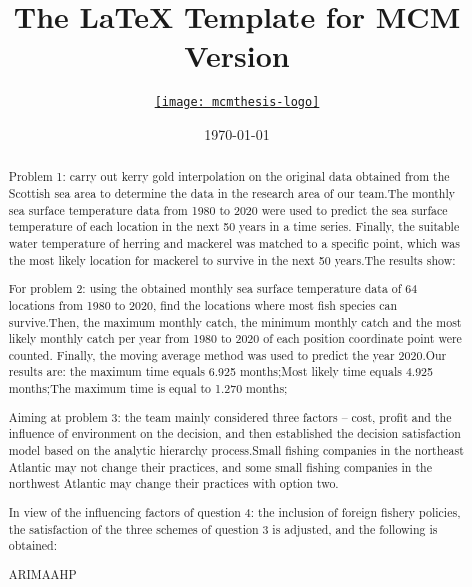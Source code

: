 \documentclass{mcmthesis}
\title{The \LaTeX{} Template for MCM Version \MCMversion}
\author{\small \href{http://www.latexstudio.net/}
  {\texttt{[image: mcmthesis-logo]}}}
\date{\today}
\begin{document}
\begin{abstract}
Problem 1: carry out kerry gold interpolation on the original data obtained from the Scottish sea area to determine the data in the
research area of our team.The monthly sea surface temperature data from 1980 to 2020 were used to predict the sea surface temperature of each location in the next 50 years in a time series. Finally, the suitable water temperature of herring and mackerel was matched to a specific point, which was the most likely location for mackerel to survive in the next 50 years.The results show:

For problem 2: using the obtained monthly sea surface temperature data of 64 locations from 1980 to 2020, find the locations where most fish species can survive.Then, the maximum monthly catch, the minimum monthly catch and the most likely monthly catch per year from 1980 to 2020 of each position coordinate point were counted. Finally, the moving average method was used to predict the year 2020.Our results are: the maximum time equals 6.925 months;Most likely time equals 4.925 months;The maximum time is equal to 1.270 months;

Aiming at problem 3: the team mainly considered three factors -- cost, profit and the influence of environment on the decision, and then established the decision satisfaction model based on the analytic hierarchy process.Small fishing companies in the northeast Atlantic may not change their practices, and some small fishing companies in the northwest Atlantic may change their practices with option two.

In view of the influencing factors of question 4: the inclusion of foreign fishery policies, the satisfaction of the three schemes of question 3 is adjusted, and the following is obtained:
\begin{keywords}
ARIMA\quad AHP
\end{keywords}
\end{abstract}
\maketitle
\thispagestyle{empty}
\tableofcontents


\end{document}
